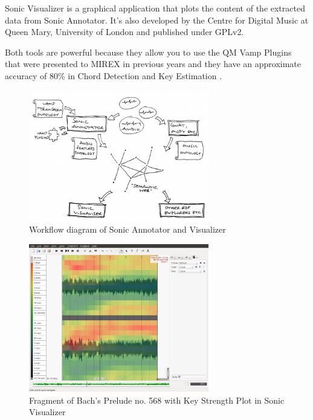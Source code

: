 \documentclass[a4paper,openany,oneside,12pt]{book}
\begin{document}
Sonic Visualizer\cite{SonicVisualiser} is a graphical application that plots the content of the extracted data from Sonic Annotator. It's also developed by the Centre for Digital Music at Queen Mary, University of London and published under GPLv2.

Both tools are powerful because they allow you to use the QM Vamp Plugins that were presented to MIREX in previous years\cite{vamp} and they have an approximate accuracy of 80\% in Chord Detection and Key Estimation \cite{noland}.

\begin{figure}
\centering
\includegraphics[width=0.7\textwidth]{img/semantic-web-and-friends-webscale.png} 
\caption{Workflow diagram of Sonic Annotator and Visualizer} \label{fig:diag_sonic}
\end{figure}

\begin{figure}
\centering
\includegraphics[width=0.7\textwidth]{img/sonic_visualizer.png} 
\caption{Fragment of Bach's Prelude no. 568 with Key Strength Plot in Sonic Visualizer} \label{fig:keystrength}
\end{figure}
\end{document}
